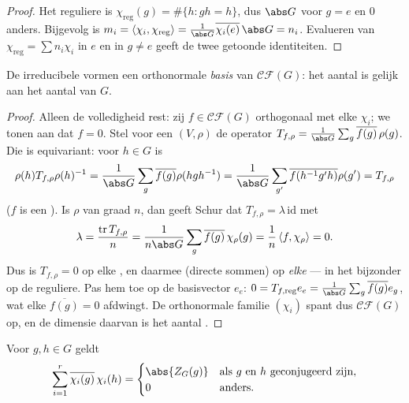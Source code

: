 \begin{proof}
Het reguliere  is $\chi_{\mathrm{reg}}(g) = \#\{h : gh =
h\}$, dus $\abs G$ voor $g = e$ en $0$ anders. Bijgevolg is $m_i =
\langle \chi_i,\chi_{\mathrm{reg}}\rangle = \frac1{\abs
G}\overline{\chi_i(e)}\,\abs G = n_i$. Evalueren van
$\chi_{\mathrm{reg}} = \sum n_i\chi_i$ in $e$ en in $g \neq e$
geeft de twee getoonde identiteiten.
\end{proof}

\begin{theorem}\label{thm:b3:representations:numberirr}
De irreducibele  vormen een orthonormale \emph{basis} van
$\mathcal{CF}(G)$: het aantal  is
gelijk aan het aantal  van $G$.
\end{theorem}

\begin{proof}
Alleen de volledigheid rest: zij $f \in \mathcal{CF}(G)$
orthogonaal met elke $\chi_i$; we tonen aan dat $f = 0$. Stel voor
een  $(V,\rho)$ de operator $T_{f,\rho} =
\frac{1}{\abs G} \sum_g \overline{f(g)}\,\rho(g)$. Die is
equivariant: voor $h \in G$ is
\[
\rho(h)T_{f,\rho}\rho(h)^{-1} = \frac1{\abs G}\sum_g
\overline{f(g)}\rho(hgh^{-1})
= \frac1{\abs G}\sum_{g'}\overline{f(h^{-1}g'h)}\rho(g') =
T_{f,\rho}
\]
($f$ is een ). Is $\rho$  van graad $n$,
dan geeft Schur dat $T_{f,\rho} = \lambda\,\mathrm{id}$ met
\[
\lambda = \frac{\operatorname{tr}T_{f,\rho}}{n}
= \frac{1}{n\abs G}\sum_g \overline{f(g)}\,\chi_\rho(g)
= \frac1n\,\langle f, \chi_\rho\rangle = 0 .
\]
Dus is $T_{f,\rho} = 0$ op elke , en
daarmee (directe sommen) op \emph{elke}  --- in het
bijzonder op de reguliere. Pas hem toe op de basisvector $e_e$: $0
= T_{f,\mathrm{reg}}e_e = \frac1{\abs
G}\sum_g\overline{f(g)}e_g$, wat elke $\overline{f(g)} = 0$
afdwingt. De orthonormale familie $(\chi_i)$ spant dus
$\mathcal{CF}(G)$ op, en de dimensie daarvan is het aantal
.
\end{proof}

\begin{corollary}[Kolomorthogonaliteit]
\label{cor:b3:representations:column}
Voor $g, h \in G$ geldt
\[
\sum_{i=1}^{r}\overline{\chi_i(g)}\,\chi_i(h) =
\begin{cases}
\abs{Z_G(g)} & \text{als } g \text{ en } h \text{ geconjugeerd
zijn},\\
0 & \text{anders.}
\end{cases}
\]
\end{corollary}

